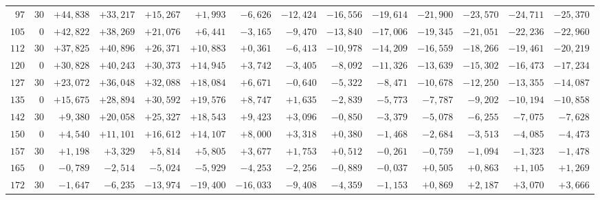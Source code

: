 \begin{landscape}
\begin{longtable}{@{}rr|r|r|r|r|r|r|r|r|r|r|r|r@{}}
\(97\) & \(30\) & \(+44{,}838\) & \(+33{,}217\) & \(+15{,}267\) & \(+1{,}993\) & \(-6{,}626\) & \(-12{,}424\) & \(-16{,}556\) & \(-19{,}614\) & \(-21{,}900\) & \(-23{,}570\) & \(-24{,}711\) & \(-25{,}370\)\\
\(105\) & \(0\) & \(+42{,}822\) & \(+38{,}269\) & \(+21{,}076\) & \(+6{,}441\) & \(-3{,}165\) & \(-9{,}470\) & \(-13{,}840\) & \(-17{,}006\) & \(-19{,}345\) & \(-21{,}051\) & \(-22{,}236\) & \(-22{,}960\)\\
\(112\) & \(30\) & \(+37{,}825\) & \(+40{,}896\) & \(+26{,}371\) & \(+10{,}883\) & \(+0{,}361\) & \(-6{,}413\) & \(-10{,}978\) & \(-14{,}209\) & \(-16{,}559\) & \(-18{,}266\) & \(-19{,}461\) & \(-20{,}219\)\\[2pt]
\(120\) & \(0\) & \(+30{,}828\) & \(+40{,}243\) & \(+30{,}373\) & \(+14{,}945\) & \(+3{,}742\) & \(-3{,}405\) & \(-8{,}092\) & \(-11{,}326\) & \(-13{,}639\) & \(-15{,}302\) & \(-16{,}473\) & \(-17{,}234\)\\
\(127\) & \(30\) & \(+23{,}072\) & \(+36{,}048\) & \(+32{,}088\) & \(+18{,}084\) & \(+6{,}671\) & \(-0{,}640\) & \(-5{,}322\) & \(-8{,}471\) & \(-10{,}678\) & \(-12{,}250\) & \(-13{,}355\) & \(-14{,}087\)\\
\(135\) & \(0\) & \(+15{,}675\) & \(+28{,}894\) & \(+30{,}592\) & \(+19{,}576\) & \(+8{,}747\) & \(+1{,}635\) & \(-2{,}839\) & \(-5{,}773\) & \(-7{,}787\) & \(-9{,}202\) & \(-10{,}194\) & \(-10{,}858\)\\
\(142\) & \(30\) & \(+9{,}380\) & \(+20{,}058\) & \(+25{,}327\) & \(+18{,}543\) & \(+9{,}423\) & \(+3{,}096\) & \(-0{,}850\) & \(-3{,}379\) & \(-5{,}078\) & \(-6{,}255\) & \(-7{,}075\) & \(-7{,}628\)\\[2pt]
\(150\) & \(0\) & \(+4{,}540\) & \(+11{,}101\) & \(+16{,}612\) & \(+14{,}107\) & \(+8{,}000\) & \(+3{,}318\) & \(+0{,}380\) & \(-1{,}468\) & \(-2{,}684\) & \(-3{,}513\) & \(-4{,}085\) & \(-4{,}473\)\\
\(157\) & \(30\) & \(+1{,}198\) & \(+3{,}329\) & \(+5{,}814\) & \(+5{,}805\) & \(+3{,}677\) & \(+1{,}753\) & \(+0{,}512\) & \(-0{,}261\) & \(-0{,}759\) & \(-1{,}094\) & \(-1{,}323\) & \(-1{,}478\)\\
\(165\) & \(0\) & \(-0{,}789\) & \(-2{,}514\) & \(-5{,}024\) & \(-5{,}929\) & \(-4{,}253\) & \(-2{,}256\) & \(-0{,}889\) & \(-0{,}037\) & \(+0{,}505\) & \(+0{,}863\) & \(+1{,}105\) & \(+1{,}269\)\\
\(172\) & \(30\) & \(-1{,}647\) & \(-6{,}235\) & \(-13{,}974\) & \(-19{,}400\) & \(-16{,}033\) & \(-9{,}408\) & \(-4{,}359\) & \(-1{,}153\) & \(+0{,}869\) & \(+2{,}187\) & \(+3{,}070\) & \(+3{,}666\)\\[2pt]

\end{longtable}
\end{landscape}
